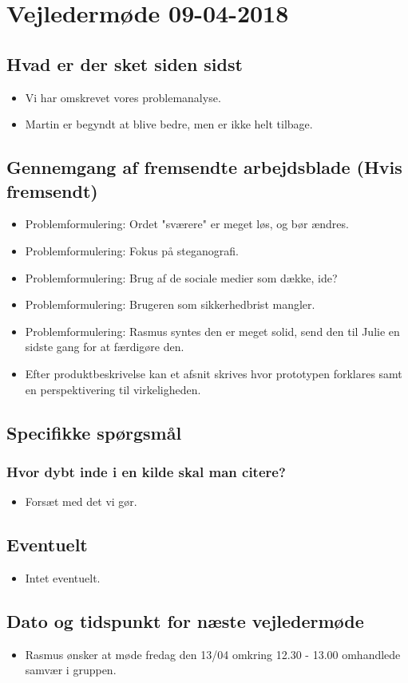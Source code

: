 \newpage
\section{Vejledermøde 09-04-2018}
\subsection{Hvad er der sket siden sidst}
\begin{itemize}
    \item Vi har omskrevet vores problemanalyse.
    \item Martin er begyndt at blive bedre, men er ikke helt tilbage.
\end{itemize}
\subsection{Gennemgang af fremsendte arbejdsblade (Hvis fremsendt)}
\begin{itemize}
    \item Problemformulering: Ordet "sværere" er meget løs, og bør ændres.
    \item Problemformulering: Fokus på steganografi.
    \item Problemformulering: Brug af de sociale medier som dække, ide?
    \item Problemformulering: Brugeren som sikkerhedbrist mangler.
    \item Problemformulering: Rasmus syntes den er meget solid, send den til Julie en sidste gang for at færdigøre den.
    \item Efter produktbeskrivelse kan et afsnit skrives hvor prototypen forklares samt en perspektivering til virkeligheden.
\end{itemize}
\subsection{Specifikke spørgsmål}
\subsubsection{Hvor dybt inde i en kilde skal man citere?}
\begin{itemize}
    \item Forsæt med det vi gør.
\end{itemize}

\subsection{Eventuelt}
\begin{itemize}
    \item Intet eventuelt.
\end{itemize}

\subsection{Dato og tidspunkt for næste vejledermøde}
\begin{itemize}
    \item Rasmus ønsker at møde fredag den 13/04 omkring 12.30 - 13.00 omhandlede samvær i gruppen.
\end{itemize}